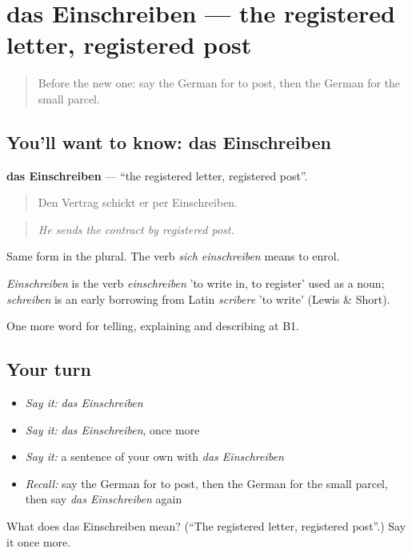 \section[das Einschreiben]{das Einschreiben — the registered letter, registered post}

\label{lesson:GE-C448-einschreiben}



\begin{quote}
Before the new one: say the German for to post, then the German for the small parcel.
\end{quote}

\subsection*{You'll want to know: das Einschreiben}
\textbf{das Einschreiben} — \textquotedblleft{}the registered letter, registered post\textquotedblright{}.

\begin{quote}
Den Vertrag schickt er per Einschreiben.
\end{quote}

\begin{quote}
\emph{He sends the contract by registered post.}
\end{quote}

Same form in the plural. The verb \emph{sich einschreiben} means to enrol.

\begin{cousinweb}
\emph{Einschreiben} is the verb \emph{einschreiben} 'to write in, to register' used as a noun; \emph{schreiben} is an early borrowing from Latin \emph{scrībere} 'to write' (Lewis \& Short).
\end{cousinweb}

\begin{grammarlens}[title={What you've built}]
One more word for telling, explaining and describing at B1.
\end{grammarlens}

\subsection*{Your turn}
\begin{itemize}
\raggedright
  \item \emph{Say it:} \emph{das Einschreiben}
  \item \emph{Say it:} \emph{das Einschreiben}, once more
  \item \emph{Say it:} a sentence of your own with \emph{das Einschreiben}
  \item \emph{Recall:} say the German for to post, then the German for the small parcel, then say \emph{das Einschreiben} again
\end{itemize}

\begin{tcolorbox}[breakable,colback=teal!4,colframe=teal!35!black,title={Before you move on}]
What does das Einschreiben mean? (\textquotedblleft{}The registered letter, registered post\textquotedblright{}.) Say it once more.
\end{tcolorbox}
